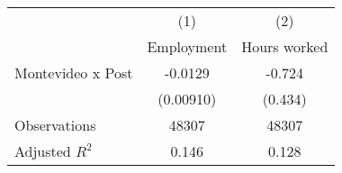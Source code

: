 {
\def\sym#1{\ifmmode^{#1}\else\(^{#1}\)\fi}
\begin{tabular}{l*{2}{c}}
\hline\hline
                &\multicolumn{1}{c}{(1)}&\multicolumn{1}{c}{(2)}\\
                &\multicolumn{1}{c}{Employment}&\multicolumn{1}{c}{Hours worked}\\
\hline
Montevideo x Post&  -0.0129         &   -0.724         \\
                &(0.00910)         &  (0.434)         \\
\hline
Observations    &    48307         &    48307         \\
Adjusted \(R^{2}\)&    0.146         &    0.128         \\
\hline\hline
\end{tabular}
}
